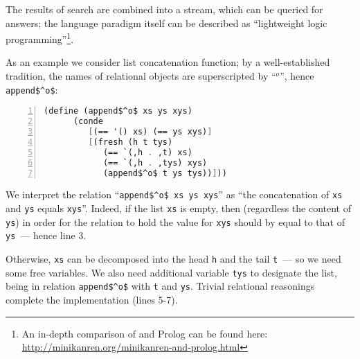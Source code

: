 The results of search are combined into a stream, which can be queried for answers; the language paradigm itself
can be described as ``lightweight logic programming''\footnote{An in-depth comparison of \miniKanren and Prolog can be found
here: \url{http://minikanren.org/minikanren-and-prolog.html}}.
 
As an example we consider list concatenation function; by a well-established tradition, the names 
of relational objects are superscripted by ``$^o$'', hence \lstinline{append$^o$}: 

\begin{lstlisting}[mathescape=true,language=scheme,numbers=left,numberstyle=\small,stepnumber=1,numbersep=-5pt]
   (define (append$^o$ xs ys xys) 
      (conde 
         [(== '() xs) (== ys xys)]
         [(fresh (h t tys)
            (== `(,h . ,t) xs)
            (== `(,h . ,tys) xys)
            (append$^o$ t ys tys))]))
\end{lstlisting}

We interpret the relation ``\lstinline{append$^o$ xs ys xys}'' as ``the concatenation of \lstinline{xs} and \lstinline{ys} 
equals \lstinline{xys}''. Indeed, if the list \lstinline{xs} is empty, then (regardless the content of \lstinline{ys}) in order for the relation to hold 
the value for \lstinline{xys} should by equal to that of \lstinline{ys}~--- hence line 3. 

Otherwise, \lstinline{xs} can be decomposed into the head \lstinline{h} and the tail \lstinline{t}~--- so we need some free variables. We also
need additional variable \lstinline{tys} to designate the list, being in relation \lstinline{append$^o$} with \lstinline{t} and \lstinline{ys}.
Trivial relational reasonings complete the implementation (lines 5-7).

